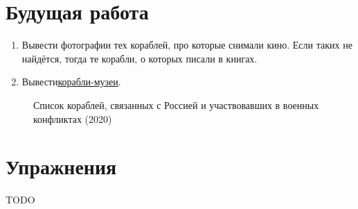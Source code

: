 \section{Будущая работа}

\begin{enumerate}
  \item Вывести фотографии тех кораблей, про которые снимали кино. Если таких не найдётся, тогда те корабли, о которых писали в книгах.
  \item Вывести\href{https://ru.wikipedia.org/wiki/Список_кораблей-музеев}{корабли-музеи}.
\end{enumerate}



\begin{figure*}[h]
  {
  \setlength{\fboxsep}{0pt}%
  \setlength{\fboxrule}{1pt}%
  }
    \caption{Список кораблей, связанных с Россией и участвовавших в военных конфликтах (2020)}%
    \label{fig:ships_by_country_and_conflict}%
\end{figure*}


\section{Упражнения}

TODO
